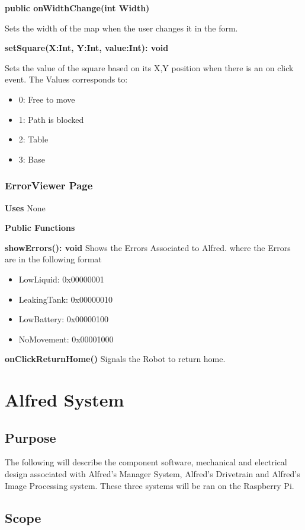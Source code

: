 \documentclass [10pt]{article}
\begin{document}
\textbf{public onWidthChange(int Width)}

Sets the width of the map when the user changes it in the form.

\textbf{setSquare(X:Int, Y:Int, value:Int): void}

Sets the value of the square based on its X,Y position when there is an on click event. The Values corresponds to: 
 
\begin{itemize}
	\item 0: Free to move
	\item 1: Path is blocked
	\item 2: Table
	\item 3: Base
\end{itemize}

\subsubsection{ErrorViewer Page}
\textbf{Uses}
None

\textbf{Public Functions}

\textbf{ showErrors(): void}
Shows the Errors Associated to Alfred. where the Errors are in the following format
\begin{itemize}
	\item LowLiquid: 0x00000001
	\item LeakingTank: 0x00000010
	\item LowBattery: 0x00000100
	\item NoMovement: 0x00001000
\end{itemize}

\textbf{onClickReturnHome()}
Signals the Robot to return home.

\section {Alfred System}


\subsection{Purpose}
The following will describe the component software, mechanical and electrical design associated with Alfred's Manager System, Alfred's Drivetrain and Alfred's Image Processing system. These three systems will be ran on the Raspberry Pi. 

\subsection{Scope}
\end{document}
